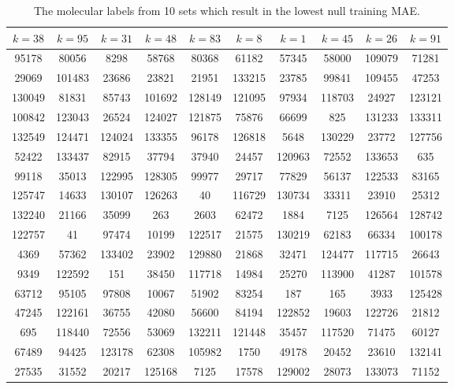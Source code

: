 \documentclass[12pt]{article}
\begin{document}
\begin{appendices}
\newpage
\begin{table}[H]
	\captionsetup{font=scriptsize}
	\tiny
	\centering
	\caption{The molecular labels from 10 sets which result in the lowest null training MAE.}
	\begin{tabular}{|c|c|c|c|c|c|c|c|c|c|}
		\hline
		$k=38$	& $k=95$	& $k=31$	& $k=48$	& $k=83$	& $k=8$	& $k=1$	& $k=45$	& $k=26$	& $k=91$	\\ \hline
		95178	& 80056	& 8298	& 58768	& 80368	& 61182	& 57345	& 58000	& 109079	& 71281	\\ \hline
		29069	& 101483	& 23686	& 23821	& 21951	& 133215	& 23785	& 99841	& 109455	& 47253	\\ \hline
		130049	& 81831	& 85743	& 101692	& 128149	& 121095	& 97934	& 118703	& 24927	& 123121	\\ \hline
		100842	& 123043	& 26524	& 124027	& 121875	& 75876	& 66699	& 825	& 131233	& 133311	\\ \hline
		132549	& 124471	& 124024	& 133355	& 96178	& 126818	& 5648	& 130229	& 23772	& 127756	\\ \hline
		52422	& 133437	& 82915	& 37794	& 37940	& 24457	& 120963	& 72552	& 133653	& 635	\\ \hline
		99118	& 35013	& 122995	& 128305	& 99977	& 29717	& 77829	& 56137	& 122533	& 83165	\\ \hline
		125747	& 14633	& 130107	& 126263	& 40	& 116729	& 130734	& 33311	& 23910	& 25312	\\ \hline
		132240	& 21166	& 35099	& 263	& 2603	& 62472	& 1884	& 7125	& 126564	& 128742	\\ \hline
		122757	& 41	& 97474	& 10199	& 122517	& 21575	& 130219	& 62183	& 66334	& 100178	\\ \hline
		4369	& 57362	& 133402	& 23902	& 129880	& 21868	& 32471	& 124477	& 117715	& 26643	\\ \hline
		9349	& 122592	& 151	& 38450	& 117718	& 14984	& 25270	& 113900	& 41287	& 101578	\\ \hline
		63712	& 95105	& 97808	& 10067	& 51902	& 83254	& 187	& 165	& 3933	& 125428	\\ \hline
		47245	& 122161	& 36755	& 42080	& 56600	& 84194	& 122852	& 19603	& 122726	& 21812	\\ \hline
		695	& 118440	& 72556	& 53069	& 132211	& 121448	& 35457	& 117520	& 71475	& 60127	\\ \hline
		67489	& 94425	& 123178	& 62308	& 105982	& 1750	& 49178	& 20452	& 23610	& 132141	\\ \hline
		27535	& 31552	& 20217	& 125168	& 7125	& 17578	& 129002	& 28073	& 133073	& 71152	\\ \hline

\end{tabular}
\end{table}
\end{appendices}
\end{document}

